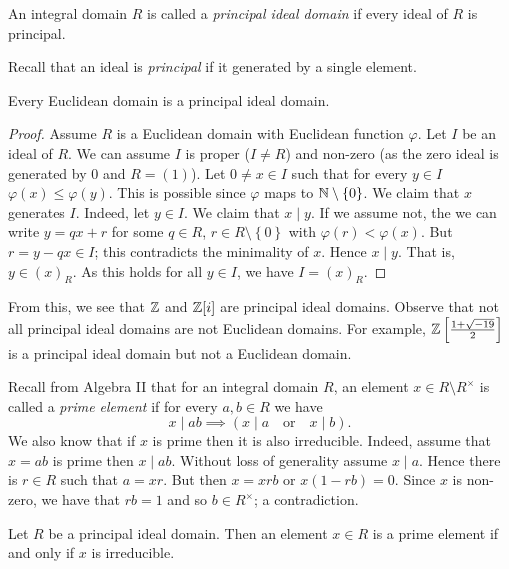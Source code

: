 
\begin{definition}
	An integral domain $R$ is called a \emph{principal ideal domain}
	if every ideal of $R$ is principal.
\end{definition}

Recall that an ideal is \emph{principal} if it generated by a single element.

\begin{proposition}[]
	Every Euclidean domain is a principal ideal domain.
\end{proposition}

\begin{proof}
	Assume $R$ is a Euclidean domain with Euclidean function $\varphi$.
	Let $I$ be an ideal of $R$.
	We can assume $I$ is proper ($I \neq R$) and non-zero
	(as the zero ideal is generated by $0$ and $R = (1)$).
	Let $0 \neq x \in I$ such that for every $y \in I$
	$\varphi(x) \leq \varphi(y)$.
	This is possible since $\varphi$ maps to $\mathbb{N} \setminus \left\{
		0
	\right\}$.
	We claim that $x$ generates $I$.
	Indeed, let $y \in I$.
	We claim that $x \mid y$.
	If we assume not, the we can write $y = qx + r$ for some $q \in R$,
	$r \in R \setminus \left\{
		0
	\right\}$ with $\varphi(r) < \varphi(x)$.
	But $r = y - qx \in I$;
	this contradicts the minimality of $x$.
	Hence $x \mid y$. That is, $y \in (x)_R$.
	As this holds for all $y \in I$, we have $I = (x)_R$.
\end{proof}

From this, we see that $\mathbb{Z}$ and $\mathbb{Z}[i]$ are principal ideal domains.
Observe that not all principal ideal domains are not Euclidean domains.
For example, $\mathbb{Z}\left[\frac{1 + \sqrt{-19}}{2}\right]$ is a
principal ideal domain but not a Euclidean domain.

Recall from Algebra II that for an integral domain $R$, an element
$x \in R \setminus R^\times$ is called a \emph{prime element} if for every
$a, b \in R$ we have
\[
	x \mid ab \implies (x \mid a \quad\text{or}\quad x \mid b).
\]
We also know that if $x$ is prime then it is also irreducible.
Indeed, assume that $x = ab$ is prime then $x \mid ab$.  
Without loss of generality assume $x \mid a$.  
Hence there is $r \in R$ such that $a = xr$.
But then $x = xrb$ or $x(1 - rb) = 0$.
Since $x$ is non-zero, we have that $rb = 1$ and so $b \in R^\times$;
a contradiction.

\begin{proposition}[]
	Let $R$ be a principal ideal domain.
	Then an element $x \in R$ is a prime element if and only if $x$ is
	irreducible.
\end{proposition}

